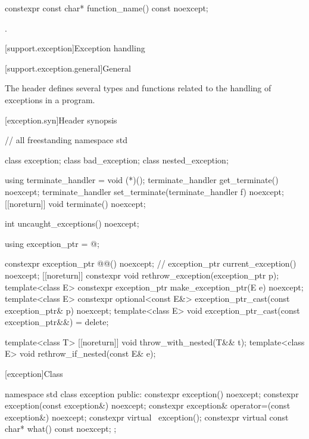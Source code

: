 \begin{itemdecl}
constexpr const char* function_name() const noexcept;
\end{itemdecl}
\begin{itemdescr}
\pnum
\returns
{}.
\end{itemdescr}

[support.exception]{Exception handling}

[support.exception.general]{General}

\pnum
The header 
defines several types and functions related to the handling of exceptions in a \Cpp{} program.

[exception.syn]{Header  synopsis}

\begin{codeblock}
// all freestanding
namespace std {
  class exception;
  class bad_exception;
  class nested_exception;

  using terminate_handler = void (*)();
  terminate_handler get_terminate() noexcept;
  terminate_handler set_terminate(terminate_handler f) noexcept;
  [[noreturn]] void terminate() noexcept;

  int uncaught_exceptions() noexcept;

  using exception_ptr = @\unspec@;

  constexpr exception_ptr @@() noexcept;    // \expos
  exception_ptr current_exception() noexcept;
  [[noreturn]] constexpr void rethrow_exception(exception_ptr p);
  template<class E> constexpr exception_ptr make_exception_ptr(E e) noexcept;
  template<class E>
    constexpr optional<const E&> exception_ptr_cast(const exception_ptr& p) noexcept;
  template<class E> void exception_ptr_cast(const exception_ptr&&) = delete;

  template<class T> [[noreturn]] void throw_with_nested(T&& t);
  template<class E> void rethrow_if_nested(const E& e);
}
\end{codeblock}

[exception]{Class }

%
%
\begin{codeblock}
namespace std {
  class exception {
  public:
    constexpr exception() noexcept;
    constexpr exception(const exception&) noexcept;
    constexpr exception& operator=(const exception&) noexcept;
    constexpr virtual ~exception();
    constexpr virtual const char* what() const noexcept;
  };
}
\end{codeblock}

